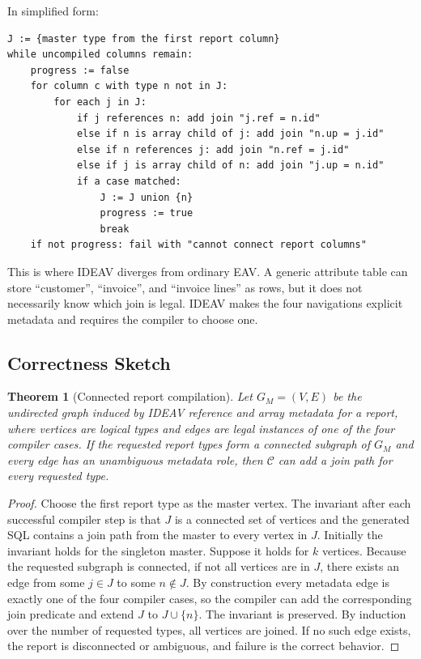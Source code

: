 \documentclass[11pt]{article}
\newtheorem{theorem}{Theorem}
\begin{document}
In simplified form:

\begin{verbatim}
J := {master type from the first report column}
while uncompiled columns remain:
    progress := false
    for column c with type n not in J:
        for each j in J:
            if j references n: add join "j.ref = n.id"
            else if n is array child of j: add join "n.up = j.id"
            else if n references j: add join "n.ref = j.id"
            else if j is array child of n: add join "j.up = n.id"
            if a case matched:
                J := J union {n}
                progress := true
                break
    if not progress: fail with "cannot connect report columns"
\end{verbatim}

This is where IDEAV diverges from ordinary EAV. A generic attribute table can
store ``customer'', ``invoice'', and ``invoice lines'' as rows, but it does not
necessarily know which join is legal. IDEAV makes the four navigations explicit
metadata and requires the compiler to choose one.

\subsection{Correctness Sketch}

\begin{theorem}[Connected report compilation]
Let \(G_M=(V,E)\) be the undirected graph induced by IDEAV reference and array
metadata for a report, where vertices are logical types and edges are legal
instances of one of the four compiler cases. If the requested report types form
a connected subgraph of \(G_M\) and every edge has an unambiguous metadata role,
then \(\mathcal{C}\) can add a join path for every requested type.
\end{theorem}

\begin{proof}
Choose the first report type as the master vertex. The invariant after each
successful compiler step is that \(J\) is a connected set of vertices and the
generated SQL contains a join path from the master to every vertex in \(J\).
Initially the invariant holds for the singleton master. Suppose it holds for
\(k\) vertices. Because the requested subgraph is connected, if not all vertices
are in \(J\), there exists an edge from some \(j \in J\) to some
\(n \notin J\). By construction every metadata edge is exactly one of the four
compiler cases, so the compiler can add the corresponding join predicate and
extend \(J\) to \(J \cup \{n\}\). The invariant is preserved. By induction over
the number of requested types, all vertices are joined. If no such edge exists,
the report is disconnected or ambiguous, and failure is the correct behavior.
\end{proof}
\end{document}

